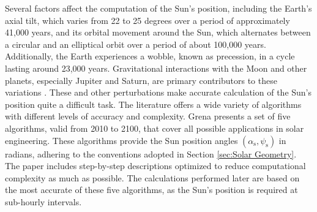 Several factors affect the computation of the Sun's position, including the Earth's
axial tilt, which varies from 22 to 25 degrees over a period of approximately 41,000
years, and its orbital movement around the Sun, which alternates between a circular
and an elliptical orbit over a period of about 100,000 years. Additionally, the Earth
experiences a wobble, known as precession, in a cycle lasting around 23,000 years.
Gravitational interactions with the Moon and other planets, especially Jupiter and
Saturn, are primary contributors to these variations \cite[p.~2]{Muneer}. These and
other perturbations make accurate calculation of the Sun's position quite a difficult task.
The literature offers a wide variety of algorithms with different levels of accuracy
and complexity. Grena \cite{Grena} presents a set of five algorithms, valid from
2010 to 2100, that cover all possible applications in solar engineering. These
algorithms provide the Sun position angles \((\alpha_{\text{s}}, \psi_{\text{s}})\) in radians,
adhering to the conventions adopted in Section \ref{sec:Solar Geometry}. The
paper includes step-by-step descriptions optimized to reduce computational
complexity as much as possible. The calculations performed later
are based on the most accurate of these five algorithms, as the Sun's position
is required at sub-hourly intervals.


